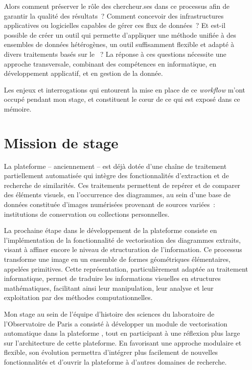 Alors comment préserver le rôle des chercheur.ses dans ce processus afin de garantir la qualité des résultats~? Comment concevoir des infrastructures applicatives ou logicielles capables de gérer ces flux de données~? Et est-il possible de créer un outil qui permette d'appliquer une méthode unifiée à des ensembles de données hétérogènes, un outil suffisamment flexible et adapté à divers traitements basés sur le \ml~? La réponse à ces questions nécessite une approche transversale, combinant des compétences en informatique, en développement applicatif, et en gestion de la donnée. 

Les enjeux et interrogations qui entourent la mise en place de ce \textit{workflow} m'ont occupé pendant mon stage, et constituent le cœur de ce qui est exposé dans ce mémoire. 

\section{Mission de stage}

La plateforme \aikon -- anciennement \eida -- est déjà dotée d’une chaîne de traitement partiellement automatisée qui intègre des fonctionnalités d’extraction et de recherche de similarités. Ces traitements permettent de repérer et de comparer des éléments visuels, en l'occurrence des diagrammes, au sein d’une base de données constituée d’images numérisées provenant de sources variées~: institutions de conservation ou collections personnelles.

La prochaine étape dans le développement de la plateforme consiste en l'implémentation de la fonctionnalité de vectorisation des diagrammes extraits, visant à affiner encore le niveau de structuration de l’information. Ce processus transforme une image en un ensemble de formes géométriques élémentaires, appelées primitives. Cette représentation, particulièrement adaptée au traitement informatique, permet de traduire les informations visuelles en structures mathématiques, facilitant ainsi leur manipulation, leur analyse et leur exploitation par des méthodes computationnelles.

Mon stage au sein de l'équipe d'histoire des sciences du laboratoire \syrte de l'Observatoire de Paris a consisté à développer un module de vectorisation automatique dans la plateforme \aikon, tout en participant à une réflexion plus large sur l'architecture de cette plateforme. En favorisant une approche modulaire et flexible, son évolution permettra d'intégrer plus facilement de nouvelles fonctionnalités et d'ouvrir la plateforme à d'autres domaines de recherche.

